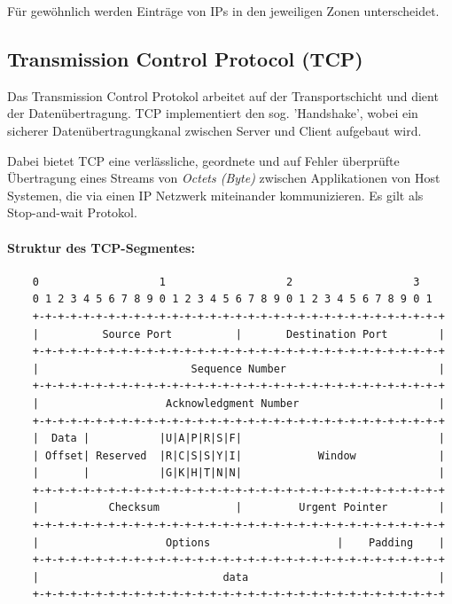 \documentclass{scrartcl}
\begin{document}
    Für gewöhnlich werden Einträge von IPs in den jeweiligen Zonen unterscheidet.

    \pagebreak
    \subsection{Transmission Control Protocol (TCP)}
    \label{protocols:tcp}
    Das Transmission Control Protokol arbeitet auf der Transportschicht und dient der Datenübertragung. 
    TCP implementiert den sog. 'Handshake', 
    wobei ein sicherer Datenübertragungkanal zwischen Server und Client aufgebaut wird. 
    
    Dabei bietet TCP eine verlässliche,
    geordnete und auf Fehler überprüfte Übertragung eines Streams von \emph{Octets (Byte)} zwischen Applikationen
    von Host Systemen, die via einen IP Netzwerk miteinander kommunizieren.
    Es gilt als Stop-and-wait Protokol.
    
    \paragraph{Struktur des TCP-Segmentes:}
   
    \begin{verbatim}
    0                   1                   2                   3
    0 1 2 3 4 5 6 7 8 9 0 1 2 3 4 5 6 7 8 9 0 1 2 3 4 5 6 7 8 9 0 1
    +-+-+-+-+-+-+-+-+-+-+-+-+-+-+-+-+-+-+-+-+-+-+-+-+-+-+-+-+-+-+-+-+
    |          Source Port          |       Destination Port        |
    +-+-+-+-+-+-+-+-+-+-+-+-+-+-+-+-+-+-+-+-+-+-+-+-+-+-+-+-+-+-+-+-+
    |                        Sequence Number                        |
    +-+-+-+-+-+-+-+-+-+-+-+-+-+-+-+-+-+-+-+-+-+-+-+-+-+-+-+-+-+-+-+-+
    |                    Acknowledgment Number                      |
    +-+-+-+-+-+-+-+-+-+-+-+-+-+-+-+-+-+-+-+-+-+-+-+-+-+-+-+-+-+-+-+-+
    |  Data |           |U|A|P|R|S|F|                               |
    | Offset| Reserved  |R|C|S|S|Y|I|            Window             |
    |       |           |G|K|H|T|N|N|                               |
    +-+-+-+-+-+-+-+-+-+-+-+-+-+-+-+-+-+-+-+-+-+-+-+-+-+-+-+-+-+-+-+-+
    |           Checksum            |         Urgent Pointer        |
    +-+-+-+-+-+-+-+-+-+-+-+-+-+-+-+-+-+-+-+-+-+-+-+-+-+-+-+-+-+-+-+-+
    |                    Options                    |    Padding    |
    +-+-+-+-+-+-+-+-+-+-+-+-+-+-+-+-+-+-+-+-+-+-+-+-+-+-+-+-+-+-+-+-+
    |                             data                              |
    +-+-+-+-+-+-+-+-+-+-+-+-+-+-+-+-+-+-+-+-+-+-+-+-+-+-+-+-+-+-+-+-+        
    \end{verbatim}
    
\end{document}
